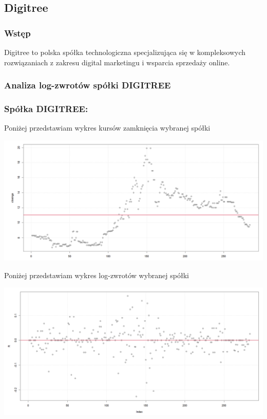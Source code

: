 \documentclass[a4paper,11pt]{article}
\begin{document}
\subsection{Digitree}

\subsubsection{Wstęp}
Digitree to polska spółka technologiczna specjalizująca się w kompleksowych rozwiązaniach z zakresu digital marketingu i wsparcia sprzedaży online.


\subsubsection{Analiza log-zwrotów spółki DIGITREE}

\subsubsection{Spółka DIGITREE:}
Poniżej przedstawiam wykres kursów zamknięcia wybranej spółki

\centerline{\includegraphics[width=14cm]{./Janek/zamkniecie.png}}

Poniżej przedstawiam wykres log-zwrotów wybranej spółki

\centerline{\includegraphics[width=14cm]{./Janek/logzwroty.png}}
\end{document}
